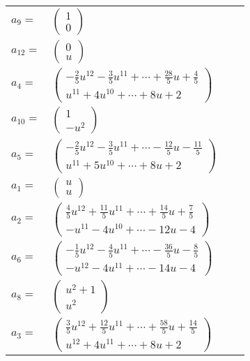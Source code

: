 \documentclass[1p]{elsarticle_modified}
\theoremstyle{definition}
\begin{document}
\begin{tabular}{m{7pt} m{180pt} m{7pt} m{180pt} }
\flushright $a_{9}=$&$\begin{pmatrix}1\\0\end{pmatrix}$ \\
\flushright $a_{12}=$&$\begin{pmatrix}0\\u\end{pmatrix}$ \\
\flushright $a_{4}=$&$\begin{pmatrix}-\frac{2}{5} u^{12}-\frac{3}{5} u^{11}+\cdots+\frac{28}{5} u+\frac{4}{5}\\u^{11}+4 u^{10}+\cdots+8 u+2\end{pmatrix}$ \\
\flushright $a_{10}=$&$\begin{pmatrix}1\\- u^2\end{pmatrix}$ \\
\flushright $a_{5}=$&$\begin{pmatrix}-\frac{2}{5} u^{12}-\frac{3}{5} u^{11}+\cdots-\frac{12}{5} u-\frac{11}{5}\\u^{11}+5 u^{10}+\cdots+8 u+2\end{pmatrix}$ \\
\flushright $a_{1}=$&$\begin{pmatrix}u\\u\end{pmatrix}$ \\
\flushright $a_{2}=$&$\begin{pmatrix}\frac{4}{5} u^{12}+\frac{11}{5} u^{11}+\cdots+\frac{14}{5} u+\frac{7}{5}\\- u^{11}-4 u^{10}+\cdots-12 u-4\end{pmatrix}$ \\
\flushright $a_{6}=$&$\begin{pmatrix}-\frac{1}{5} u^{12}-\frac{4}{5} u^{11}+\cdots-\frac{36}{5} u-\frac{8}{5}\\- u^{12}-4 u^{11}+\cdots-14 u-4\end{pmatrix}$ \\
\flushright $a_{8}=$&$\begin{pmatrix}u^2+1\\u^2\end{pmatrix}$ \\
\flushright $a_{3}=$&$\begin{pmatrix}\frac{3}{5} u^{12}+\frac{12}{5} u^{11}+\cdots+\frac{58}{5} u+\frac{14}{5}\\u^{12}+4 u^{11}+\cdots+8 u+2\end{pmatrix}$ \\

\end{tabular}
\end{document}
